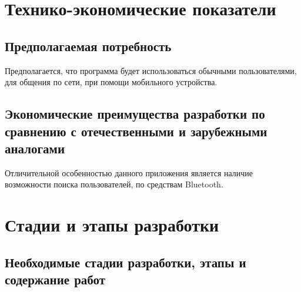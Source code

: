 \documentclass[techtask]{espd}
\begin{document}
\section{Технико-экономические показатели}
\subsection{Предполагаемая потребность}
Предполагается, что программа будет использоваться обычными пользователями, для общения по сети, при помощи мобильного устройства.

\subsection{Экономические преимущества разработки по сравнению с отечественными и зарубежными аналогами}
Отличительной особенностью данного приложения является наличие возможности поиска пользователей, по средствам Bluetooth.

\section{Стадии и этапы разработки}
\subsection{Необходимые стадии разработки, этапы и содержание работ}
\end{document}
